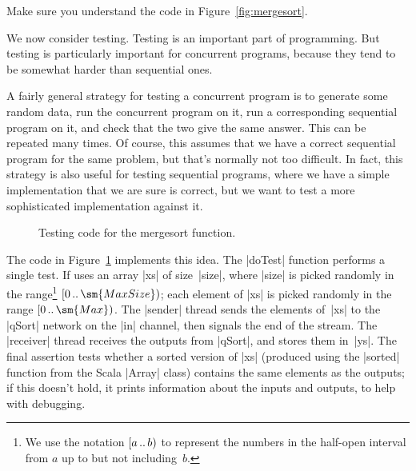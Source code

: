 \begin{instruction}
Make sure you understand the code in Figure~\ref{fig:mergesort}.
\end{instruction}


We now consider testing.  Testing is an important part of programming.  But
testing is particularly important for concurrent programs, because they tend
to be somewhat harder than sequential ones.

A fairly general strategy for testing a concurrent program is to generate some
random data, run the concurrent program on it, run a corresponding sequential
program on it, and check that the two give the same answer.  This can be
repeated many times.  Of course, this assumes that we have a correct
sequential program for the same problem, but that's normally not too
difficult.  In fact, this strategy is also useful for testing sequential
programs, where we have a simple implementation that we are sure is correct,
but we want to test a more sophisticated implementation against it.

\begin{figure}
\caption{Testing code for the {\scalashape mergesort} function.}
\label{fig:mergesort-test}
\end{figure}

The code in Figure~\ref{fig:mergesort-test} implements this idea.  The
|doTest| function performs a single test.  If uses an array |xs| of
size~|size|, where |size| is picked randomly in the range\footnote{We use the
  notation $[a \,..\, b)$ to represent the numbers in the half-open
  interval from $a$ up to but not including~$b$.}
$\interval{0}{\sm{MaxSize}}$; each element of |xs| is picked randomly in the
range $\interval{0}{\sm{Max}}$.  The |sender| thread sends the elements
of~|xs| to the |qSort| network on the |in| channel, then signals the end of
the stream.  The |receiver| thread receives the outputs from |qSort|, and
stores them in~|ys|.  The final assertion tests whether a sorted version of
|xs| (produced using the |sorted| function from the Scala |Array| class)
contains the same elements as the outputs; if this doesn't hold, it prints
information about the inputs and outputs, to help with debugging.

